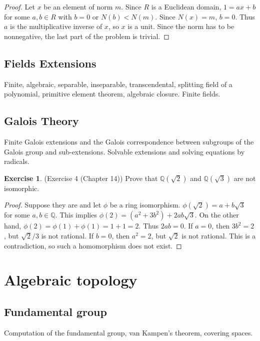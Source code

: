 \documentclass[12pt, psamsfonts]{amsart}
\theoremstyle{definition}
\newtheorem*{exer}{Exercise}
\theoremstyle{remark}
\numberwithin{equation}{section}
\begin{document}
\begin{proof}
  Let $x$ be an element of norm $m$.
  Since $R$ is a Euclidean domain, $1 = ax + b$ for some $a, b \in R$ with $b = 0$ or $N(b) < N(m)$.
  Since $N(x) = m$, $b = 0$.
  Thus $a$ is the multiplicative inverse of $x$, so $x$ is a unit.
  Since the norm has to be nonnegative, the last part of the problem is trivial.
\end{proof}


\subsection{Fields Extensions}
Finite, algebraic, separable, inseparable, transcendental, splitting field of a polynomial, primitive element theorem, algebraic closure.
Finite fields.

\subsection{Galois Theory}
Finite Galois extensions and the Galois correspondence between subgroups of the Galois group and sub-extensions.
Solvable extensions and solving equations by radicals.

\begin{exer}{(Exercise 4 (Chapter 14))}
  Prove that $\mathbb{Q}(\sqrt{2})$ and $\mathbb{Q}(\sqrt{3})$ are not isomorphic.
\end{exer}

\begin{proof}
  Suppose they are and let $\phi$ be a ring isomorphism.
  $\phi(\sqrt{2}) = a + b\sqrt{3}$ for some $a, b \in \mathbb{Q}$.
  This implies $\phi(2) = (a^2 + 3b^2) + 2ab\sqrt{3}$.
  On the other hand, $\phi(2) = \phi(1) + \phi(1) = 1 + 1 = 2$.
  Thus $2ab = 0$.
  If $a = 0$, then $3b^2 = 2$, but $\sqrt{2}/3$ is not rational.
  If $b = 0$, then $a^2 = 2$, but $\sqrt{2}$ is not rational.
  This is a contradiction, so such a homomorphism does not exist.
\end{proof}

\section{Algebraic topology}

\subsection{Fundamental group}
Computation of the fundamental group, van Kampen's theorem, covering spaces.
\end{document}
